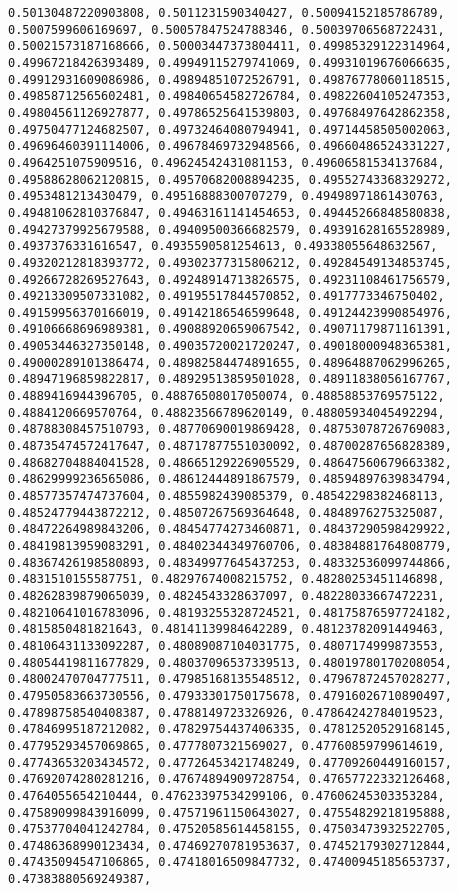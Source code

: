 \documentclass[11pt]{article}
\begin{document}
\begin{Verbatim}[commandchars=\\\{\}]
0.50130487220903808, 0.5011231590340427, 0.50094152185786789, 0.5007599606169697, 0.50057847524788346, 0.50039706568722431, 0.50021573187168666, 0.50003447373804411, 0.49985329122314964, 0.49967218426393489, 0.49949115279741069, 0.49931019676066635, 0.49912931609086986, 0.49894851072526791, 0.49876778060118515, 0.49858712565602481, 0.49840654582726784, 0.49822604105247353, 0.49804561126927877, 0.49786525641539803, 0.49768497642862358, 0.49750477124682507, 0.49732464080794941, 0.49714458505002063, 0.49696460391114006, 0.49678469732948566, 0.49660486524331227, 0.4964251075909516, 0.49624542431081153, 0.49606581534137684, 0.49588628062120815, 0.49570682008894235, 0.49552743368329272, 0.4953481213430479, 0.49516888300707279, 0.49498971861430763, 0.49481062810376847, 0.49463161141454653, 0.49445266848580838, 0.49427379925679588, 0.49409500366682579, 0.49391628165528989, 0.4937376331616547, 0.4935590581254613, 0.49338055648632567, 0.49320212818393772, 0.49302377315806212, 0.49284549134853745, 0.49266728269527643, 0.49248914713826575, 0.49231108461756579, 0.49213309507331082, 0.49195517844570852, 0.4917773346750402, 0.49159956370166019, 0.49142186546599648, 0.49124423990854976, 0.49106668696989381, 0.49088920659067542, 0.49071179871161391, 0.49053446327350148, 0.49035720021720247, 0.49018000948365381, 0.49000289101386474, 0.48982584474891655, 0.48964887062996265, 0.48947196859822817, 0.48929513859501028, 0.48911838056167767, 0.4889416944396705, 0.48876508017050074, 0.48858853769575122, 0.4884120669570764, 0.48823566789620149, 0.48805934045492294, 0.48788308457510793, 0.48770690019869428, 0.48753078726769083, 0.48735474572417647, 0.48717877551030092, 0.48700287656828389, 0.48682704884041528, 0.48665129226905529, 0.48647560679663382, 0.48629999236565086, 0.48612444891867579, 0.48594897639834794, 0.48577357474737604, 0.4855982439085379, 0.48542298382468113, 0.48524779443872212, 0.48507267569364648, 0.4848976275325087, 0.48472264989843206, 0.48454774273460871, 0.48437290598429922, 0.48419813959083291, 0.48402344349760706, 0.48384881764808779, 0.48367426198580893, 0.48349977645437253, 0.48332536099744866, 0.4831510155587751, 0.48297674008215752, 0.48280253451146898, 0.48262839879065039, 0.4824543328637097, 0.48228033667472231, 0.48210641016783096, 0.48193255328724521, 0.48175876597724182, 0.4815850481821643, 0.48141139984642289, 0.48123782091449463, 0.48106431133092287, 0.48089087104031775, 0.4807174999873553, 0.48054419811677829, 0.48037096537339513, 0.48019780170208054, 0.48002470704777511, 0.47985168135548512, 0.47967872457028277, 0.47950583663730556, 0.47933301750175678, 0.47916026710890497, 0.47898758540408387, 0.4788149723326926, 0.47864242784019523, 0.47846995187212082, 0.47829754437406335, 0.47812520529168145, 0.47795293457069865, 0.4777807321569027, 0.47760859799614619, 0.47743653203434572, 0.47726453421748249, 0.47709260449160157, 0.47692074280281216, 0.47674894909728754, 0.47657722332126468, 0.4764055654210444, 0.47623397534299106, 0.47606245303353284, 0.47589099843916099, 0.47571961150643027, 0.47554829218195888, 0.47537704041242784, 0.47520585614458155, 0.47503473932522705, 0.47486368990123434, 0.47469270781953637, 0.47452179302712844, 0.47435094547106865, 0.47418016509847732, 0.47400945185653737, 0.47383880569249387, 
\end{Verbatim}
\end{document}
